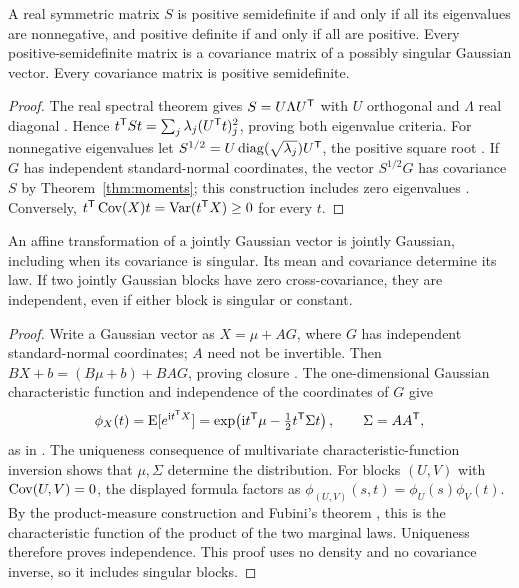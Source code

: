 \begin{theorem}
\label{thm:spectral}
A real symmetric matrix \(S\) is positive semidefinite if and only if all
its eigenvalues are nonnegative, and positive definite if and only if all
are positive. Every positive-semidefinite matrix is a covariance matrix of
a possibly singular Gaussian vector. Every covariance matrix is positive
semidefinite.
\end{theorem}

\begin{proof}
The real spectral theorem gives \(S=U\Lambda U^{\mathsf{T}}\) with \(U\)
orthogonal and \(\Lambda\) real diagonal
\cite[Theorem~7.29]{axler2024}. Hence
\(t^{\mathsf{T}}St=\sum_j\lambda_j(U^{\mathsf{T}}t)_j^2\), proving both eigenvalue
criteria. For nonnegative eigenvalues let
\(S^{1/2}=U\operatorname{diag}(\sqrt{\lambda_j})U^{\mathsf{T}}\), the positive
square root \cite[Theorem~7.38]{axler2024}. If \(G\) has independent
standard-normal coordinates, the vector \(S^{1/2}G\) has covariance \(S\)
by Theorem~\ref{thm:moments}; this construction includes zero eigenvalues
\cite[Theorems~3.4.4--3.4.5, author-hosted draft]{gallager2013}.
Conversely, \(t^{\mathsf{T}}\operatorname{Cov}(X)t=\operatorname{Var}(t^{\mathsf{T}}X)\geq0\) for every \(t\).
\end{proof}

\begin{theorem}
\label{thm:gaussian}
An affine transformation of a jointly Gaussian vector is jointly Gaussian,
including when its covariance is singular. Its mean and covariance determine
its law. If two jointly Gaussian blocks have zero cross-covariance, they are
independent, even if either block is singular or constant.
\end{theorem}

\begin{proof}
Write a Gaussian vector as \(X=\mu+AG\), where \(G\) has independent
standard-normal coordinates; \(A\) need not be invertible. Then
\(BX+b=(B\mu+b)+BAG\), proving closure
\cite[Definition~3.3.1 and Theorem~3.3.1, author-hosted draft]{gallager2013}.
The one-dimensional Gaussian characteristic function and independence of
the coordinates of \(G\) give
\[
  \phi_X(t)=\operatorname{E}[e^{\mathrm i t^{\mathsf{T}}X}]
    =\exp\!\left(\mathrm i t^{\mathsf{T}}\mu-\tfrac12t^{\mathsf{T}}\Sigma t\right),
  \qquad\Sigma=AA^{\mathsf{T}},
\]
as in \cite[Theorem~3.3.2 and equations~(3.14), (3.18), author-hosted draft]{gallager2013}.
The uniqueness consequence of multivariate characteristic-function inversion
\cite[Theorem~3.10.4]{durrett2019} shows that \(\mu,\Sigma\) determine
the distribution. For blocks \((U,V)\) with \(\operatorname{Cov}(U,V)=0\), the displayed
formula factors as \(\phi_{(U,V)}(s,t)=\phi_U(s)\phi_V(t)\).
By the product-measure construction and Fubini's theorem
\cite[Theorems~1.7.1--1.7.2]{durrett2019}, this is the characteristic function
of the product of the two marginal laws. Uniqueness therefore proves independence.
This proof uses no density
and no covariance inverse, so it includes singular blocks.
\end{proof}

